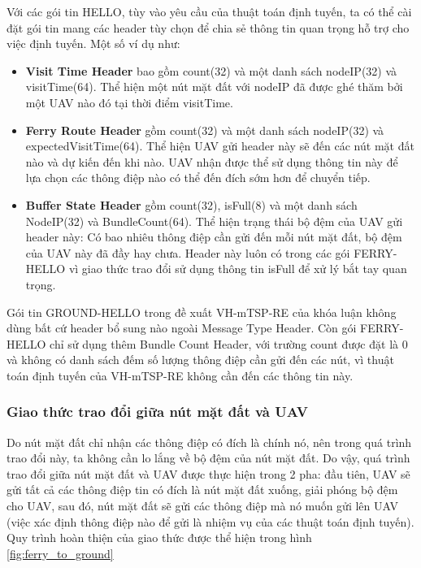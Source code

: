 \documentclass[a4paper]{article}
\begin{document}
Với các gói tin HELLO, tùy vào yêu cầu của thuật toán định tuyến, ta có thể cài đặt gói tin mang các header tùy chọn để chia sẻ thông tin quan trọng hỗ trợ cho việc định tuyến. Một số ví dụ như:

\begin{itemize}
  \item {\bfseries Visit Time Header} bao gồm count(32) và một danh sách nodeIP(32) và visitTime(64). Thể hiện một nút mặt đất với nodeIP đã được ghé thăm bởi một UAV nào đó tại thời điểm visitTime.
  \item {\bfseries Ferry Route Header} gồm count(32) và một danh sách nodeIP(32) và expectedVisitTime(64). Thể hiện UAV gửi header này sẽ đến các nút mặt đất nào và dự kiến đến khi nào. UAV nhận được thể sử dụng thông tin này để lựa chọn các thông điệp nào có thể đến đích sớm hơn để chuyển tiếp.
  \item {\bfseries Buffer State Header} gồm count(32), isFull(8) và một danh sách NodeIP(32) và BundleCount(64). Thể hiện trạng thái bộ đệm của UAV gửi header này: Có bao nhiêu thông điệp cần gửi đến mỗi nút mặt đất, bộ đệm của UAV này đã đầy hay chưa. Header này luôn có trong các gói FERRY-HELLO vì giao thức trao đổi sử dụng thông tin isFull để xử lý bắt tay quan trọng.
\end{itemize}

Gói tin GROUND-HELLO trong đề xuất VH-mTSP-RE của khóa luận không dùng bất cứ header bổ sung nào ngoài Message Type Header. Còn gói FERRY-HELLO chỉ sử dụng thêm Bundle Count Header, với trường count được đặt là 0 và không có danh sách đếm số lượng thông điệp cần gửi đến các nút, vì thuật toán định tuyến của VH-mTSP-RE không cần đến các thông tin này. 

\subsubsection{Giao thức trao đổi giữa nút mặt đất và UAV}

Do nút mặt đất chỉ nhận các thông điệp có đích là chính nó, nên trong quá trình trao đổi này, ta không cần lo lắng về bộ đệm của nút mặt đất. Do vậy, quá trình trao đổi giữa nút mặt đất và UAV được thực hiện trong 2 pha: đầu tiên, UAV sẽ gửi tất cả các thông điệp tin có đích là nút mặt đất xuống, giải phóng bộ đệm cho UAV, sau đó, nút mặt đất sẽ gửi các thông điệp mà nó muốn gửi lên UAV (việc xác định thông điệp nào để gửi là nhiệm vụ của các thuật toán định tuyến). Quy trình hoàn thiện của giao thức được thể hiện trong hình \ref{fig:ferry_to_ground}
\end{document}
